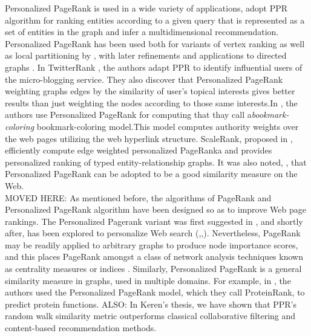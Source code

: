 \documentclass[11pt,oneside]{book}
\begin{document}
Personalized PageRank is used in a wide variety of applications, \citep{lee2011random} adopt PPR algorithm for ranking entities according to a given query that is represented as a set of entities in the graph and infer a multidimensional recommendation. Personalized PageRank has been used both for variants of vertex ranking as well as local partitioning by \citep{andersen2006local}, with later refinements \citep{andersen2007detecting} and applications to directed graphs \citep{andersen2007local}. In TwitterRank \citep{weng2010twitterrank}, the authors adapt PPR to identify influential users of the micro-blogging service. They also discover that Personalized PageRank weighting graphs edges by the similarity of user’s topical interests gives better results than just weighting the nodes according to those same interests.In \citep{berkhin2006bookmark}, the authors use Personalized PageRank for computing that thay call a\textit{bookmark-coloring} bookmark-coloring model.This model computes authority weights over the web pages utilizing the web hyperlink structure. ScaleRank, proposed in \citep{hristidis2014efficient}, efficiently compute edge weighted
personalized PageRanka and provides personalized ranking of typed entity-relationship graphs. It was also noted, \citep{sarkar2008fast}, that Personalized PageRank can be adopted to be a good similarity measure on the Web.\\
MOVED HERE: As mentioned before, the algorithms of PageRank and Personalized
PageRank algorithm have been designed so as to improve Web page
rankings. The Personalized Pagerank variant was first suggested in
\citep{brin1998can}, and shortly after, has been explored to
personalize Web search
(\citep{haveliwala2002topic},\citep{haveliwala2003topic},\citep{haveliwala2003analytical}). Nevertheless,
PageRank may be readily applied to arbitrary graphs to produce node
importance scores, and this places PageRank amongst a class of network
analysis techniques \citep{brandes2005network} known as centrality
measures or indices \citep{koschutzki2005centrality}. Similarly,
Personalized PageRank is a general similarity measure in graphs, used
in multiple domains. For example, in \citep{freschi2007protein}, the
authors used the Personalized PageRank model, which they call
ProteinRank, to predict protein functions. ALSO: In Keren's thesis, we have shown that PPR's random walk similarity metric outperforms classical collaborative
filtering and content-based recommendation methods.
\end{document}
